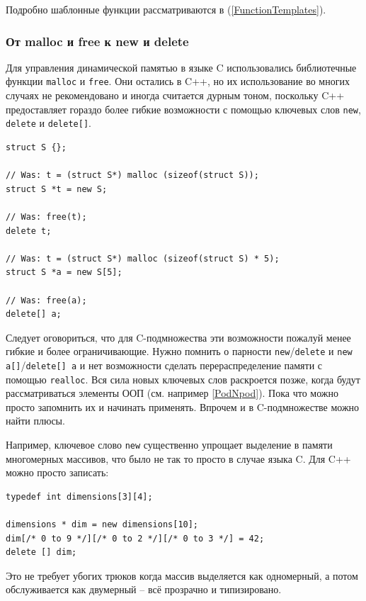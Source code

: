 \documentclass[a4paper,12pt,oneside]{article}
\begin{document}
Подробно шаблонные функции рассматриваются в (\ref{FunctionTemplates}).

\subsubsection{От malloc и free к new и delete}\label{newdelete}

Для управления динамической памятью в языке C использовались библиотечные функции \lstinline!malloc! и \lstinline!free!. Они остались в C++, но их использование во многих случаях не рекомендовано и иногда считается дурным тоном, поскольку C++ предоставляет гораздо более гибкие возможности с помощью ключевых слов \lstinline!new!, \lstinline!delete! и \lstinline!delete[]!.

\begin{lstlisting}
struct S {}; 

// Was: t = (struct S*) malloc (sizeof(struct S));
struct S *t = new S; 

// Was: free(t);
delete t; 

// Was: t = (struct S*) malloc (sizeof(struct S) * 5);
struct S *a = new S[5]; 

// Was: free(a);
delete[] a; 
\end{lstlisting}

Следует оговориться, что для C-подмножества эти возможности пожалуй менее гибкие и более ограничивающие. Нужно помнить о парности \lstinline!new!/\lstinline!delete! и \lstinline!new a[]!/\lstinline!delete[] a! и нет возможности сделать перераспределение памяти с помощью \lstinline!realloc!. Вся сила новых ключевых слов раскроется позже, когда будут рассматриваться элементы ООП (см. например \ref{PodNpod}). Пока что можно просто запомнить их и начинать применять. Впрочем и в C-подмножестве можно найти плюсы.

Например, ключевое слово \lstinline!new! существенно упрощает выделение в памяти многомерных массивов, что было не так то просто в случае языка C. Для C++ можно просто записать:

\begin{lstlisting}
typedef int dimensions[3][4];

dimensions * dim = new dimensions[10];
dim[/* 0 to 9 */][/* 0 to 2 */][/* 0 to 3 */] = 42;
delete [] dim;
\end{lstlisting}

Это не требует убогих трюков когда массив выделяется как одномерный, а потом обслуживается как двумерный -- всё прозрачно и типизировано.
\end{document}
